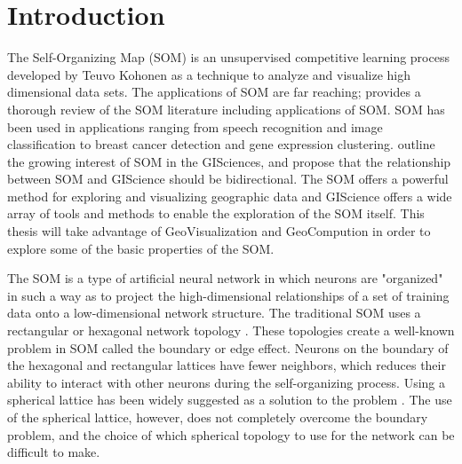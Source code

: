 \documentclass[10pt,titlepage]{article}
\begin{document}
\section{Introduction}
The Self-Organizing Map (SOM) is an unsupervised competitive learning process
developed by Teuvo Kohonen as a technique to analyze and visualize high
dimensional data sets.  The applications of SOM are far reaching;
\cite{Kohonen2000} provides a thorough review of the SOM literature including
applications of SOM.  SOM has been used in applications ranging from speech
recognition and image classification to breast cancer detection and gene
expression clustering.  \cite{skupin07} outline the growing interest of SOM in
the GISciences, and propose that the relationship between SOM and GIScience
should be bidirectional.  The SOM offers a powerful method for exploring and
visualizing geographic data and GIScience offers a wide array of tools
and methods to enable the exploration of the SOM itself.  This thesis will take
advantage of GeoVisualization and GeoCompution in order to explore some of the basic
properties of the SOM.

The SOM is a type of artificial neural network in which neurons are "organized"
in such a way as to project the high-dimensional relationships of a set of
training data onto a low-dimensional network structure.  The traditional
SOM uses a rectangular or hexagonal network topology \citep{Kohonen2000}.  These topologies 
create a well-known problem in SOM called the boundary or edge effect.  Neurons on
the boundary of the hexagonal and rectangular lattices have fewer neighbors,
which reduces their ability to interact with other neurons during the
self-organizing process.  Using a spherical lattice has been widely suggested as a
solution to the problem \citep{ritter99, boudjemai2003, sangole03,
Nishio:2006fk, wu2006}. The use of the spherical lattice, however, does not
completely overcome the boundary problem, and the choice of which spherical
topology to use for the network can be difficult to make.
\end{document}
